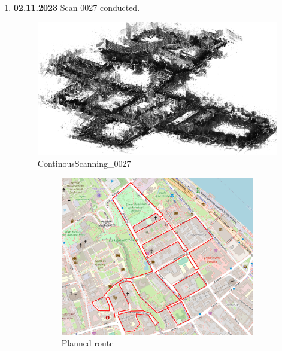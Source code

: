 \documentclass[a4paper,12pt]{book}
\begin{document}
\begin{enumerate}
	\item \textbf{02.11.2023} Scan 0027 conducted.
	\begin{figure}[H]
		\includegraphics[width=1\linewidth]{cloud27}
		\caption{ContinousScanning\_0027}
	\end{figure}
	\begin{figure}[H]
		\centering
		\begin{subfigure}{.88\textwidth}
			\centering
			\includegraphics[width=1\linewidth]{route_p27}
			\caption{Planned route}
			\label{fig:a27}
		\end{subfigure}%
		\linebreak
		\begin{subfigure}{.88\textwidth}
			\centering

\end{subfigure}
\end{figure}
\end{enumerate}
\end{document}
